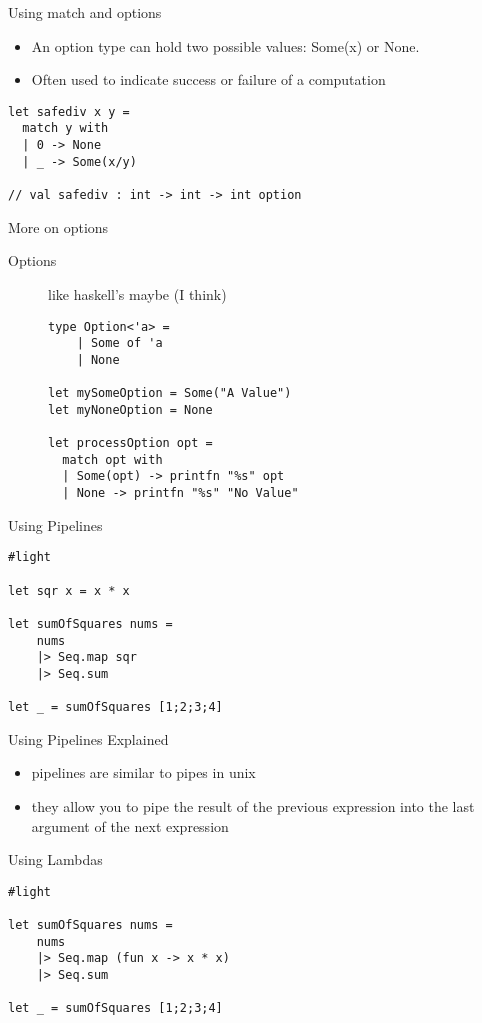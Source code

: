 \documentclass[landscape]{slides}
\begin{document}
\begin{slide}{Using match and options}
\begin{itemize}
\item An option type can hold two possible values: Some(x) or None.
\item Often used to indicate success or failure of a computation
\end{itemize}
\begin{verbatim}
let safediv x y = 
  match y with
  | 0 -> None
  | _ -> Some(x/y)
 
// val safediv : int -> int -> int option
\end{verbatim}
\end{slide}

\begin{slide}{More on options}
\begin{description} 
\item[Options] like haskell's maybe (I think)
\begin{verbatim}
type Option<'a> =
    | Some of 'a
    | None

let mySomeOption = Some("A Value")
let myNoneOption = None

let processOption opt =
  match opt with
  | Some(opt) -> printfn "%s" opt
  | None -> printfn "%s" "No Value"
\end{verbatim}
\end{description}
\end{slide}

\begin{slide}{Using Pipelines}
\begin{verbatim}
#light

let sqr x = x * x

let sumOfSquares nums =
    nums 
    |> Seq.map sqr
    |> Seq.sum

let _ = sumOfSquares [1;2;3;4]
\end{verbatim}
\end{slide}

\begin{slide}{Using Pipelines Explained}
\begin{itemize}
\item pipelines are similar to pipes in unix
\item they allow you to pipe the result of the previous expression into the last argument of the next expression
\end{itemize}
\end{slide}

\begin{slide}{Using Lambdas}
\begin{verbatim}
#light

let sumOfSquares nums =
    nums 
    |> Seq.map (fun x -> x * x) 
    |> Seq.sum

let _ = sumOfSquares [1;2;3;4]
\end{verbatim}
\end{slide}
\end{document}
